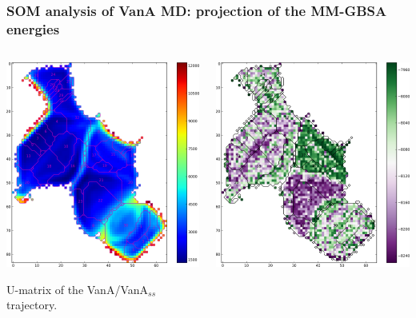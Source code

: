\begin{frame}
    \frametitle{SOM analysis of VanA MD: projection of the MM-GBSA energies}
    \begin{columns}
        \begin{column}{.5\textwidth}
            \includegraphics[width=\textwidth]{figures/umat_VanA.png}

            U-matrix of the VanA/VanA$_{ss}$ trajectory.
        \end{column}
        \begin{column}{.5\textwidth}
            \includegraphics[width=\textwidth]{figures/egbmap.png}


\end{column}
\end{columns}
\end{frame}
